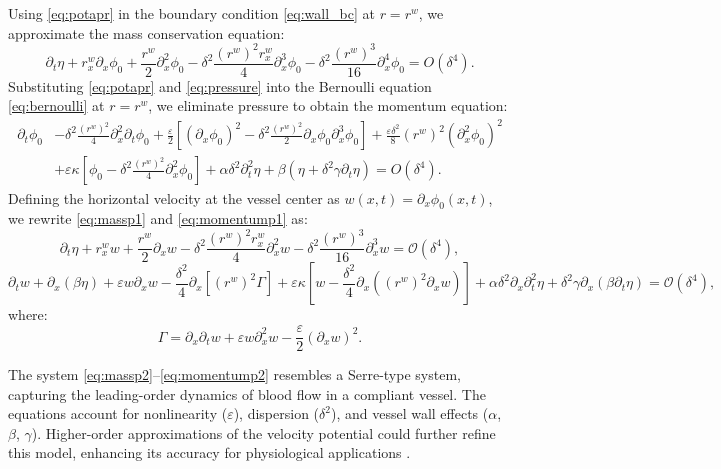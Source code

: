 \documentclass[alpha-refs, 12pt]{wiley-article}
\renewcommand{\O}{\mathcal{O}}
\newcommand{\eps}{\varepsilon}
\begin{document}
Using \eqref{eq:potapr} in the boundary condition \eqref{eq:wall_bc} at $r = r^w$, we approximate the mass conservation equation:
\begin{equation}\label{eq:massp1}
  \partial_t \eta + r^w_x \partial_x \phi_0 + \frac{r^w}{2} \partial_x^2 \phi_0 - \delta^2 \frac{(r^w)^2 r^w_x}{4} \partial_x^3 \phi_0 - \delta^2 \frac{(r^w)^3}{16} \partial_x^4 \phi_0 = O(\delta^4).
\end{equation}
Substituting \eqref{eq:potapr} and \eqref{eq:pressure} into the Bernoulli equation \eqref{eq:bernoulli} at $r = r^w$, we eliminate pressure to obtain the momentum equation:
\begin{equation}\label{eq:momentump1}
\begin{split}
\partial_t \phi_0 & - \delta^2 \frac{(r^w)^2}{4} \partial_x^2 \partial_t \phi_0 + \frac{\eps}{2} \left[ (\partial_x \phi_0)^2 - \delta^2 \frac{(r^w)^2}{2} \partial_x \phi_0 \partial_x^3 \phi_0 \right] + \frac{\eps \delta^2}{8} (r^w)^2 (\partial_x^2 \phi_0)^2 \\
& + \eps \kappa \left[ \phi_0 - \delta^2 \frac{(r^w)^2}{4} \partial_x^2 \phi_0 \right] + \alpha \delta^2 \partial_t^2 \eta + \beta (\eta + \delta^2 \gamma \partial_t \eta) = O(\delta^4).
\end{split}
\end{equation}
Defining the horizontal velocity at the vessel center as $w(x, t) = \partial_x \phi_0(x, t)$, we rewrite \eqref{eq:massp1} and \eqref{eq:momentump1} as:
\begin{equation}\label{eq:massp2}
  \partial_t \eta + r^w_x w + \frac{r^w}{2} \partial_x w - \delta^2 \frac{(r^w)^2 r^w_x}{4} \partial_x^2 w - \delta^2 \frac{(r^w)^3}{16} \partial_x^3 w = \O(\delta^4),
\end{equation}
\begin{equation}\label{eq:momentump2}
  \partial_t w + \partial_x (\beta \eta) + \eps w \partial_x w - \frac{\delta^2}{4} \partial_x \left[ (r^w)^2 \Gamma \right] + \eps \kappa \left[ w - \frac{\delta^2}{4} \partial_x \left( (r^w)^2 \partial_x w \right) \right] + \alpha \delta^2 \partial_x \partial_t^2 \eta + \delta^2 \gamma \partial_x (\beta \partial_t \eta) = \O(\delta^4),
\end{equation}
where:
\begin{equation}\label{eq:gamma}
  \Gamma = \partial_x \partial_t w + \eps w \partial_x^2 w - \frac{\eps}{2} (\partial_x w)^2.
\end{equation}

The system \eqref{eq:massp2}--\eqref{eq:momentump2} resembles a Serre-type system, capturing the leading-order dynamics of blood flow in a compliant vessel. The equations account for nonlinearity ($\eps$), dispersion ($\delta^2$), and vessel wall effects ($\alpha$, $\beta$, $\gamma$). Higher-order approximations of the velocity potential could further refine this model, enhancing its accuracy for physiological applications \cite{Mitsotakis2019}.
\end{document}
